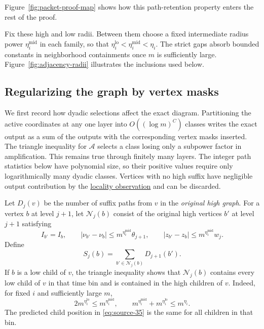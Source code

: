 Figure~\ref{fig:packet-proof-map} shows how this path-retention property
enters the rest of the proof.


Fix these high and low radii. Between them choose a fixed intermediate
radius power \(\eta_i^{\mathrm{mid}}\) in each family, so that
\(\eta_i^{\mathrm{lo}}<\eta_i^{\mathrm{mid}}<\eta_i\).
The strict gaps absorb bounded constants in neighborhood containments
once \(m\) is sufficiently large. Figure~\ref{fig:adjacency-radii}
illustrates the inclusions used below.



\subsection{Regularizing the graph by vertex masks}

We first record how dyadic selections affect the exact diagram.
Partitioning the active coordinates at any one layer into
\(O((\log m)^C)\) classes writes the exact output as a sum of the
outputs with the corresponding vertex masks inserted. The triangle
inequality for \(\mathcal A\) selects a class losing only a subpower
factor in amplification. This remains true through finitely many
layers. The integer path statistics below have polynomial size, so
their positive values require only logarithmically many dyadic
classes. Vertices with no high suffix have negligible output
contribution by the
\hyperref[ext:diagram-locality]{locality observation} and can be discarded.

Let \(D_j(v)\) be the number of suffix paths from \(v\) in the
\emph{original high graph}. For a vertex \(b\) at level \(j+1\),
let \(\mathcal N_j(b)\) consist of the original high vertices \(b'\)
at level \(j+1\) satisfying
\[
 I_{b'}=I_b,\qquad
 |\nu_{b'}-\nu_b|\leq m^{\eta_i^{\mathrm{mid}}}\theta_{j+1},
 \qquad
 |z_{b'}-z_b|\leq m^{\eta_i^{\mathrm{mid}}}w_j.
\]
Define
\[
 S_j(b)=\sum_{b'\in\mathcal N_j(b)}D_{j+1}(b').
\]
If \(b\) is a low child of \(v\), the triangle inequality shows that
\(\mathcal N_j(b)\) contains every low child of \(v\) in that time
bin and is contained in the high children of \(v\). Indeed, for fixed
\(i\) and sufficiently large \(m\),
\[
 2m^{\eta_i^{\mathrm{lo}}}\leq m^{\eta_i^{\mathrm{mid}}},
 \qquad
 m^{\eta_i^{\mathrm{mid}}}+m^{\eta_i^{\mathrm{lo}}}\leq m^{\eta_i}.
\]
The predicted child position in \eqref{eq:source-35} is the same
for all children in that bin.

